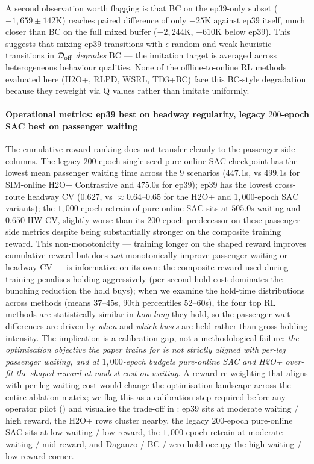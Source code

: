 A second observation worth flagging is that BC on the ep39-only subset ($-1{,}659 \pm 142$K) reaches paired difference of only $-25$K against ep39 itself, much closer than BC on the full mixed buffer ($-2{,}244$K, $-610$K below ep39). This suggests that mixing ep39 transitions with $\epsilon$-random and weak-heuristic transitions in $\mathcal{D}_{\mathrm{off}}$ \emph{degrades} BC --- the imitation target is averaged across heterogeneous behaviour qualities. None of the offline-to-online RL methods evaluated here (H2O+, RLPD, WSRL, TD3+BC) face this BC-style degradation because they reweight via Q values rather than imitate uniformly.

\paragraph{Operational metrics: ep39 best on headway regularity, legacy $200$-epoch SAC best on passenger waiting}
The cumulative-reward ranking does not transfer cleanly to the passenger-side columns.
The legacy $200$-epoch single-seed pure-online SAC checkpoint has the lowest mean passenger waiting time across the $9$ scenarios ($447.1$s, vs $499.1$s for SIM-online H2O+ Contrastive and $475.0$s for ep39); ep39 has the lowest cross-route headway CV ($0.627$, vs $\approx 0.64$--$0.65$ for the H2O+ and $1{,}000$-epoch SAC variants); the $1{,}000$-epoch retrain of pure-online SAC sits at $505.0$s waiting and $0.650$ HW CV, slightly worse than its $200$-epoch predecessor on these passenger-side metrics despite being substantially stronger on the composite training reward.
This non-monotonicity --- training longer on the shaped reward improves cumulative reward but does \emph{not} monotonically improve passenger waiting or headway CV --- is informative on its own: the composite reward used during training penalises holding aggressively (per-second hold cost dominates the bunching reduction the hold buys); when we examine the hold-time distributions across methods (means $37$--$45$s, $90$th percentiles $52$--$60$s), the four top RL methods are statistically similar in \emph{how long} they hold, so the passenger-wait differences are driven by \emph{when} and \emph{which buses} are held rather than gross holding intensity.
The implication is a calibration gap, not a methodological failure: \emph{the optimisation objective the paper trains for is not strictly aligned with per-leg passenger waiting, and at $1{,}000$-epoch budgets pure-online SAC and H2O+ over-fit the shaped reward at modest cost on waiting}.
A reward re-weighting that aligns with per-leg waiting cost would change the optimisation landscape across the entire ablation matrix; we flag this as a calibration step required before any operator pilot () and visualise the trade-off in : ep39 sits at moderate waiting / high reward, the H2O+ rows cluster nearby, the legacy $200$-epoch pure-online SAC sits at low waiting / low reward, the $1{,}000$-epoch retrain at moderate waiting / mid reward, and Daganzo / BC / zero-hold occupy the high-waiting / low-reward corner.

